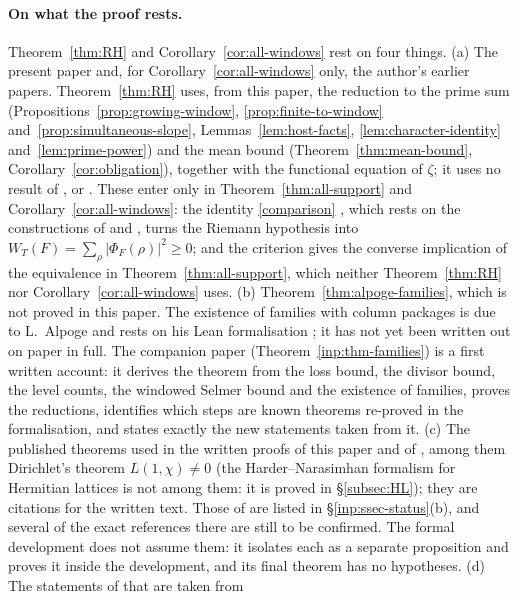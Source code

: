 \documentclass[10pt]{amsart}
\theoremstyle{definition}
\theoremstyle{remark}
\begin{document}
\paragraph{On what the proof rests.}
Theorem~\ref{thm:RH} and Corollary~\ref{cor:all-windows} rest on four
things. (a) The present paper and, for Corollary~\ref{cor:all-windows}
only, the author's earlier papers. Theorem~\ref{thm:RH} uses, from this
paper, the reduction to the prime sum
(Propositions~\ref{prop:growing-window}, \ref{prop:finite-to-window}
and~\ref{prop:simultaneous-slope}, Lemmas~\ref{lem:host-facts},
\ref{lem:character-identity} and~\ref{lem:prime-power}) and the mean bound
(Theorem~\ref{thm:mean-bound}, Corollary~\ref{cor:obligation}), together
with the functional equation of $\zeta$; it uses no result of \cite{P43},
\cite{P44} or \cite{Paper45}. These enter only in
Theorem~\ref{thm:all-support} and Corollary~\ref{cor:all-windows}: the
identity \eqref{comparison} \cite[Theorem~4.1]{Paper45}, which rests on the
constructions of \cite{P43} and \cite{P44}, turns the Riemann hypothesis
into $W_T(F)=\sum_\rho|\Phi_F(\rho)|^2\ge0$; and the criterion
\cite[Theorem~6.2]{Paper45} gives the converse implication of the
equivalence in Theorem~\ref{thm:all-support}, which neither
Theorem~\ref{thm:RH} nor Corollary~\ref{cor:all-windows} uses.
(b) Theorem~\ref{thm:alpoge-families}, which is not proved in this paper.
The existence of families with column packages is due to L.~Alpoge and
rests on his Lean formalisation \cite{CharacterFamily}; it has not yet been
written out on paper in full. The companion paper \cite{Annex}
(Theorem~\ref{inp:thm-families}) is a first written account: it derives
the theorem from the loss bound, the divisor bound, the level counts, the
windowed Selmer bound and the existence of families, proves the
reductions, identifies which steps are known theorems re-proved in the
formalisation, and states exactly the new statements taken from it.
(c) The published theorems used in the written proofs of this paper and of
\cite{Annex}, among them Dirichlet's theorem $L(1,\chi)\ne0$ (the
Harder--Narasimhan formalism for Hermitian lattices is not among them: it
is proved in \S\ref{subsec:HL}); they are citations for the written text.
Those of \cite{Annex} are listed in \S\ref{inp:ssec-status}(b), and
several of the exact references there are still to be confirmed. The
formal development does not assume them: it isolates each as a separate
proposition and proves it inside the development, and its final theorem
has no hypotheses. (d) The statements of \cite{Annex} that are taken from
\end{document}
